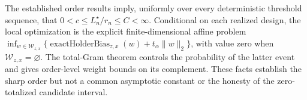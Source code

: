 The established order results imply, uniformly over every deterministic threshold sequence, that \(0<c\leq L_n^\star/r_n\leq C<\infty\).  Conditional on each realized design, the local optimization is the explicit finite-dimensional affine problem \(\inf_{w\in\mathcal W_{z,x}}\{\operatorname{exactHolderBias}_{z,x}(w)+t_\alpha\|w\|_2\}\), with value zero when \(\mathcal W_{z,x}=\varnothing\).  The total-Gram theorem controls the probability of the latter event and gives order-level weight bounds on its complement.  These facts establish the sharp order but not a common asymptotic constant or the honesty of the zero-totalized candidate interval.